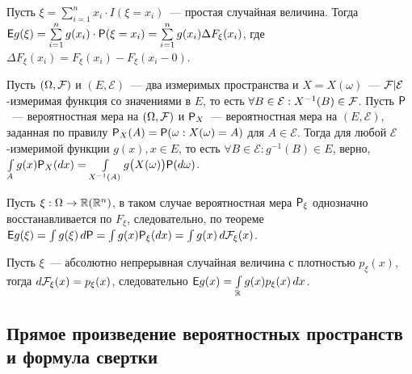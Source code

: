 Пусть $\xi = \sum\limits_{i = 1}^n x_i \cdot I (\xi = x_i)$~--- простая случайная величина. Тогда $\E g(\xi) = \sum\limits_{i=1}^{n} g(x_i) \cdot \P(\xi = x_i) = \sum\limits_{i = 1}^n g(x_i) \Delta F_\xi (x_i)$, где $\Delta F_\xi(x_i) = F_\xi(x_i) - F_\xi (x_i - 0)$.

\begin{theorem}
	Пусть $(\Omega, \F)$ и $(E, \mathcal{E})$~--- два измеримых пространства и $X = X(\omega)$~--- $\F | \mathcal{E}$-измеримая функция со значениями в $E$, то есть $\forall B \in \mathcal{E}: X^{-1}(B) \in \F$. Пусть $\P$~--- вероятностная мера на $(\Omega, \F)$ и $\P_X$~--- вероятностная мера на $(E, \mathcal{E})$, заданная по правилу $\P_X(A) = \P (\omega: X(\omega) = A)$ для $A \in \mathcal{E}$. Тогда для любой $\mathcal{E}$-измеримой функции $g(x), x \in E$, то есть $\forall B \in \mathcal{E}: g^{-1}(B) \in E$, верно, $\int\limits_A g(x) \P_X(dx) = \int\limits_{X^{-1}(A)} g\big( X(\omega) \big) \P(d \omega)$.
\end{theorem}

Пусть $\xi : \Omega \rightarrow \R (\R^n)$, в таком случае вероятностная мера $\P_\xi$ однозначно восстанавливается по $F_\xi$, следовательно, по теореме $\E g(\xi) = \int g(\xi) \, d\P = \int g(x) \P_\xi(dx) = \int g(x) \, d \F_\xi (x)$.

Пусть  $\xi$~--- абсолютно непрерывная случайная величина с плотностью $p_\xi(x)$, тогда $d \F_\xi (x) = p_\xi (x)$, следовательно $\E g(x) = \int\limits_{\R} g(x) p_\xi(x) \, d x$.

\subsection*{Прямое произведение вероятностных пространств и формула свертки}

